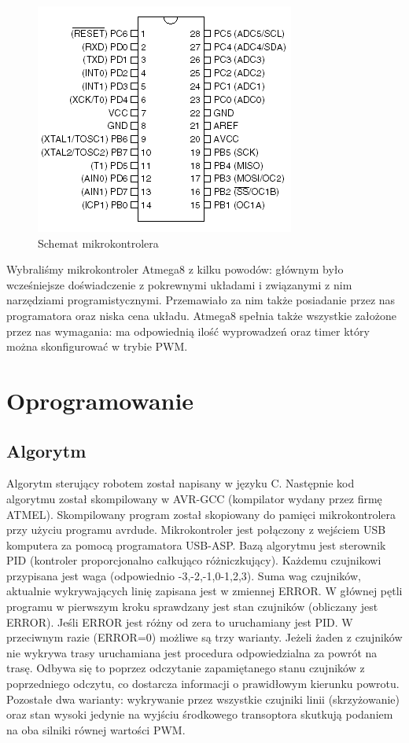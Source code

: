 \documentclass[11pt,a4paper]{article}
\begin{document}
\begin{figure}[H]
  \includegraphics[scale=1]{atmega8}
  \caption{Schemat mikrokontrolera}
\end{figure}
  Wybraliśmy mikrokontroler Atmega8 z kilku powodów: głównym było wcześniejsze doświadczenie z pokrewnymi układami i związanymi z nim narzędziami programistycznymi. Przemawiało za nim także posiadanie przez nas programatora oraz niska cena układu. Atmega8 spełnia także wszystkie założone przez nas wymagania: ma odpowiednią ilość wyprowadzeń oraz timer który można skonfigurować w trybie PWM.

\section{Oprogramowanie}
  \subsection{Algorytm}
  Algorytm sterujący robotem został napisany w języku C. Następnie kod algorytmu został skompilowany w AVR-GCC (kompilator wydany przez firmę ATMEL). Skompilowany program został skopiowany do pamięci mikrokontrolera przy użyciu programu avrdude. Mikrokontroler jest połączony z wejściem USB komputera za pomocą programatora USB-ASP. 
  Bazą algorytmu jest sterownik PID (kontroler proporcjonalno całkująco różniczkujący). Każdemu czujnikowi przypisana jest waga (odpowiednio -3,-2,-1,0-1,2,3). Suma wag czujników, aktualnie wykrywających linię zapisana jest w zmiennej ERROR.
   W głównej pętli programu w pierwszym kroku sprawdzany jest stan czujników (obliczany jest ERROR).
   Jeśli ERROR jest różny od zera to uruchamiany jest PID. W przeciwnym razie (ERROR=0) możliwe są trzy warianty.
   Jeżeli żaden z czujników nie wykrywa trasy uruchamiana jest procedura odpowiedzialna za powrót na trasę. Odbywa się to poprzez odczytanie zapamiętanego stanu czujników z poprzedniego odczytu, co dostarcza informacji o prawidłowym kierunku powrotu.
   Pozostałe dwa warianty: wykrywanie przez wszystkie czujniki linii (skrzyżowanie) oraz stan wysoki jedynie na wyjściu środkowego transoptora skutkują podaniem na oba silniki równej wartości PWM.
\end{document}
